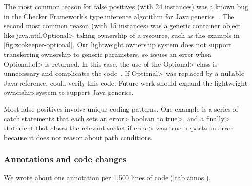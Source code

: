 The most common reason for false
positives (with 24 instances) was
a known bug in the Checker Framework’s
type inference algorithm for Java generics~\cite{issue979}.
The second most common reason (with 15 instances)
was a generic container object like \<java.util.Optional> taking ownership of a resource, such
as the example in \cref{fig:zookeeper-optional}. Our lightweight ownership
system does not support transferring ownership to generic parameters,
so \tool issues an error when \<Optional.of> is returned. In this case, the use
of the \<Optional> class is unnecessary and complicates the
code~\cite{ErnstNothingIsBetterThanOptional}.  If \<Optional> was replaced
by a nullable Java reference,
\tool could verify this code. Future work should expand the lightweight ownership system to
support Java generics.

Most false positives involve unique coding patterns.
One example
 is a series of catch
statements that each sets an \<error> boolean to \<true>, and
a \<finally> statement that closes the relevant socket if \<error>
was true.  \Tool reports an error because it does not reason about path
conditions.

\subsubsection{Annotations and code changes}\label{sec:annotations-and-code-changes}
\label{sec:annos}



We wrote about one annotation per 1,500 lines of code (\cref{tab:annos}).

